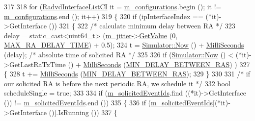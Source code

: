 \begin{DoxyCode}
317 
318               \textcolor{keywordflow}{for} (\hyperlink{classns3_1_1Radvd_ae425a17fa24b2716bd104f81450e158b}{RadvdInterfaceListCI} it = 
      \hyperlink{classns3_1_1Radvd_ad47ced3406790e0b78b5b141e0568aa9}{m\_configurations}.begin (); it != \hyperlink{classns3_1_1Radvd_ad47ced3406790e0b78b5b141e0568aa9}{m\_configurations}.end (); it++)
319                 \{
320                   \textcolor{keywordflow}{if} (ipInterfaceIndex == (*it)->GetInterface ())
321                     \{
322                       \textcolor{comment}{/* calculate minimum delay between RA */}
323                       delay = \textcolor{keyword}{static\_cast<}uint64\_t\textcolor{keyword}{>} (\hyperlink{classns3_1_1Radvd_a14f71f3c45656a0280d512cb1b148839}{m\_jitter}->\hyperlink{classns3_1_1UniformRandomVariable_a03822d8c86ac51e9aa83bbc73041386b}{GetValue} (0, 
      \hyperlink{classns3_1_1Radvd_a941069848477f9c31c5e0a4e961d2653}{MAX\_RA\_DELAY\_TIME}) + 0.5);
324                       t = \hyperlink{classns3_1_1Simulator_ac3178fa975b419f7875e7105be122800}{Simulator::Now} () + \hyperlink{group__timecivil_gaf26127cf4571146b83a92ee18679c7a9}{MilliSeconds} (delay); \textcolor{comment}{/* absolute
       time of solicited RA */}
325 
326                       \textcolor{keywordflow}{if} (\hyperlink{classns3_1_1Simulator_ac3178fa975b419f7875e7105be122800}{Simulator::Now} () < (*it)->GetLastRaTxTime () + 
      \hyperlink{group__timecivil_gaf26127cf4571146b83a92ee18679c7a9}{MilliSeconds} (\hyperlink{classns3_1_1Radvd_a9a4a728aa868bc0e5b5cf692fa235642}{MIN\_DELAY\_BETWEEN\_RAS}) )
327                         \{
328                           t += \hyperlink{group__timecivil_gaf26127cf4571146b83a92ee18679c7a9}{MilliSeconds} (\hyperlink{classns3_1_1Radvd_a9a4a728aa868bc0e5b5cf692fa235642}{MIN\_DELAY\_BETWEEN\_RAS});
329                         \}
330 
331                       \textcolor{comment}{/* if our solicited RA is before the next periodic RA, we schedule it */}
332                       \textcolor{keywordtype}{bool} scheduleSingle = \textcolor{keyword}{true};
333 
334                       \textcolor{keywordflow}{if} (\hyperlink{classns3_1_1Radvd_a135124427566b60ccc12b6b93e708484}{m\_solicitedEventIds}.find ((*it)->GetInterface ()) != 
      \hyperlink{classns3_1_1Radvd_a135124427566b60ccc12b6b93e708484}{m\_solicitedEventIds}.end ())
335                         \{
336                           \textcolor{keywordflow}{if} (\hyperlink{classns3_1_1Radvd_a135124427566b60ccc12b6b93e708484}{m\_solicitedEventIds}[(*it)->GetInterface ()].IsRunning ())
337                             \{

\end{DoxyCode}
